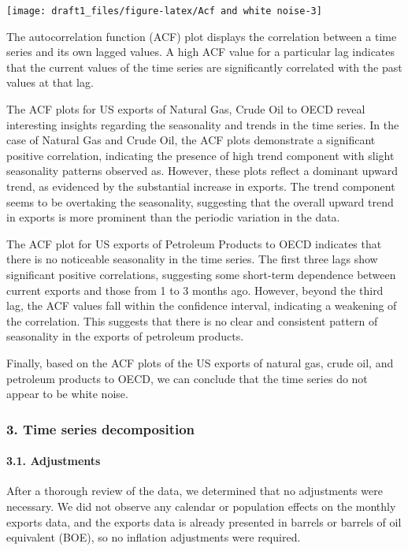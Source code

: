 \documentclass[
]{article}
\begin{document}
\begin{center}\texttt{[image: draft1\_files/figure-latex/Acf and white noise-3]} \end{center}

The autocorrelation function (ACF) plot displays the correlation between
a time series and its own lagged values. A high ACF value for a
particular lag indicates that the current values of the time series are
significantly correlated with the past values at that lag.

The ACF plots for US exports of Natural Gas, Crude Oil to OECD reveal
interesting insights regarding the seasonality and trends in the time
series. In the case of Natural Gas and Crude Oil, the ACF plots
demonstrate a significant positive correlation, indicating the presence
of high trend component with slight seasonality patterns observed as.
However, these plots reflect a dominant upward trend, as evidenced by
the substantial increase in exports. The trend component seems to be
overtaking the seasonality, suggesting that the overall upward trend in
exports is more prominent than the periodic variation in the data.

The ACF plot for US exports of Petroleum Products to OECD indicates that
there is no noticeable seasonality in the time series. The first three
lags show significant positive correlations, suggesting some short-term
dependence between current exports and those from 1 to 3 months ago.
However, beyond the third lag, the ACF values fall within the confidence
interval, indicating a weakening of the correlation. This suggests that
there is no clear and consistent pattern of seasonality in the exports
of petroleum products.

Finally, based on the ACF plots of the US exports of natural gas, crude
oil, and petroleum products to OECD, we can conclude that the time
series do not appear to be white noise.

\hypertarget{time-series-decomposition}{%
\subsubsection{3. Time series
decomposition}\label{time-series-decomposition}}

\hypertarget{adjustments}{%
\paragraph{3.1. Adjustments}\label{adjustments}}

After a thorough review of the data, we determined that no adjustments
were necessary. We did not observe any calendar or population effects on
the monthly exports data, and the exports data is already presented in
barrels or barrels of oil equivalent (BOE), so no inflation adjustments
were required.
\end{document}
